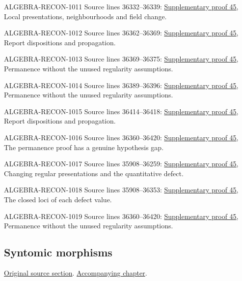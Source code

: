 \begin{AlgebraSourceRoutes}
\item[ALGEBRA-RECON-1011] Source lines 36332--36339: \hyperlink{algebra_lci_notes_20260928}{Supplementary proof 45}, Local presentations, neighbourhoods and field change.
\item[ALGEBRA-RECON-1012] Source lines 36362--36369: \hyperlink{algebra_lci_notes_20260928}{Supplementary proof 45}, Report dispositions and propagation.
\item[ALGEBRA-RECON-1013] Source lines 36369--36375: \hyperlink{algebra_lci_notes_20260928}{Supplementary proof 45}, Permanence without the unused regularity assumptions.
\item[ALGEBRA-RECON-1014] Source lines 36389--36396: \hyperlink{algebra_lci_notes_20260928}{Supplementary proof 45}, Permanence without the unused regularity assumptions.
\item[ALGEBRA-RECON-1015] Source lines 36414--36418: \hyperlink{algebra_lci_notes_20260928}{Supplementary proof 45}, Report dispositions and propagation.
\item[ALGEBRA-RECON-1016] Source lines 36360--36420: \hyperlink{algebra_lci_notes_20260928}{Supplementary proof 45}, The permanence proof has a genuine hypothesis gap.
\item[ALGEBRA-RECON-1017] Source lines 35908--36259: \hyperlink{algebra_lci_notes_20260928}{Supplementary proof 45}, Changing regular presentations and the quantitative defect.
\item[ALGEBRA-RECON-1018] Source lines 35908--36353: \hyperlink{algebra_lci_notes_20260928}{Supplementary proof 45}, The closed loci of each defect value.
\item[ALGEBRA-RECON-1019] Source lines 36360--36420: \hyperlink{algebra_lci_notes_20260928}{Supplementary proof 45}, Permanence without the unused regularity assumptions.
\end{AlgebraSourceRoutes}

\subsection{Syntomic morphisms}
\hypertarget{algebra-source-section-syntomic}{}
\noindent\href{https://github.com/stacks/stacks-project/blob/a04446e57ec1fbc252a871afcec7752fb2807b14/algebra.tex\#L36427}{Original source section}. \href{algebra.pdf\#nameddest=section-syntomic}{Accompanying chapter}.

